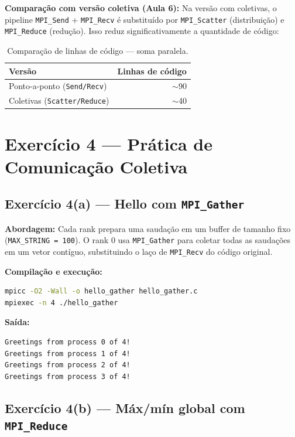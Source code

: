 \documentclass[10pt,small,a4paper]{article}
\begin{document}
\textbf{Comparação com versão coletiva (Aula 6):}
Na versão com coletivas, o pipeline \texttt{MPI\_Send} + \texttt{MPI\_Recv}
é substituído por \texttt{MPI\_Scatter} (distribuição) e \texttt{MPI\_Reduce}
(redução). Isso reduz significativamente a quantidade de código:

\begin{table}[H]
    \centering
    \caption{Comparação de linhas de código — soma paralela.}
    \begin{tabular}{@{}lr@{}}
        \toprule
        Versão & Linhas de código \\
        \midrule
        Ponto-a-ponto (\texttt{Send/Recv}) & $\sim$90 \\
        Coletivas (\texttt{Scatter/Reduce}) & $\sim$40 \\
        \bottomrule
    \end{tabular}
\end{table}

\section{Exercício 4 — Prática de Comunicação Coletiva}

\subsection{Exercício 4(a) — Hello com \texttt{MPI\_Gather}}

\textbf{Abordagem:} Cada rank prepara uma saudação em um buffer de tamanho fixo
(\texttt{MAX\_STRING = 100}). O rank 0 usa \texttt{MPI\_Gather} para coletar
todas as saudações em um vetor contíguo, substituindo o laço de \texttt{MPI\_Recv}
do código original.

\textbf{Compilação e execução:}
\begin{lstlisting}[language=bash,numbers=none]
mpicc -O2 -Wall -o hello_gather hello_gather.c
mpiexec -n 4 ./hello_gather
\end{lstlisting}

\textbf{Saída:}
\begin{lstlisting}[language={},numbers=none]
Greetings from process 0 of 4!
Greetings from process 1 of 4!
Greetings from process 2 of 4!
Greetings from process 3 of 4!
\end{lstlisting}

\subsection{Exercício 4(b) — Máx/mín global com \texttt{MPI\_Reduce}}
\end{document}
